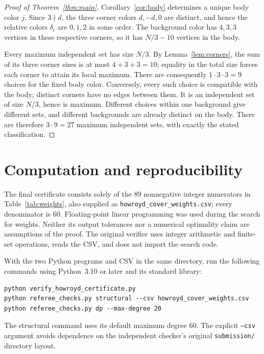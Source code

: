 \documentclass[11pt]{article}
\begin{document}
\begin{proof}[Proof of Theorem~\ref{thm:main}]
Corollary~\ref{cor:body} determines a unique body color \(j\).
Since \(3\nmid d\), the three corner colors \(d,-d,0\) are distinct,
and hence the relative colors \(\delta_i\) are \(0,1,2\) in some order.
The background color has \(4,3,3\) vertices in these respective
corners, so it has \(N/3-10\) vertices in the body.

Every maximum independent set has size \(N/3\).
By Lemma~\ref{lem:corners}, the sum of its three corner sizes is at
most \(4+3+3=10\); equality in the total size forces each corner
to attain its local maximum. There are consequently
\(1\cdot3\cdot3=9\) choices for the fixed body color.
Conversely, every such choice is compatible with the body;
distinct corners have no edges between them. It is an independent
set of size \(N/3\), hence is maximum.
Different choices within one background give different sets, and
different backgrounds are already distinct on the body.
There are therefore \(3\cdot9=27\) maximum independent sets, with
exactly the stated classification.
\end{proof}

\section{Computation and reproducibility}\label{sec:computation}

The final certificate consists solely of the \(89\) nonnegative
integer numerators in Table~\ref{tab:weights}, also supplied as
\texttt{howroyd\_cover\_weights.csv}; every denominator is \(60\).
Floating-point linear programming was used during the search for
weights. Neither its output tolerances nor a numerical optimality
claim are assumptions of the proof. The original verifier uses
integer arithmetic and finite-set operations, reads the CSV, and
does not import the search code.

With the two Python programs and CSV in the same directory, run
the following commands using Python~3.10 or later and its standard
library:
\begingroup
\footnotesize
\begin{verbatim}
python verify_howroyd_certificate.py
python referee_checks.py structural --csv howroyd_cover_weights.csv
python referee_checks.py dp --max-degree 20
\end{verbatim}
\endgroup
The structural command uses its default maximum degree \(60\).
The explicit \texttt{--csv} argument avoids dependence on the
independent checker's original \texttt{submission/} directory layout.
\end{document}
